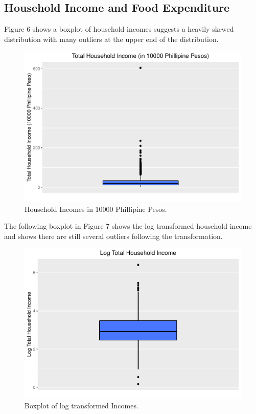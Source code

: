 \documentclass[
]{article}
\begin{document}
\hypertarget{household-income-and-food-expenditure}{%
\subsection{Household Income and Food
Expenditure}\label{household-income-and-food-expenditure}}

Figure 6 shows a boxplot of household incomes suggests a heavily skewed
distribution with many outliers at the upper end of the distribution.

\begin{figure}[H]

{\centering \includegraphics[width=0.8\linewidth]{Group_01_Project2_demo_files/figure-latex/balance boxplot-1} 

}

\caption{Household Incomes in 10000 Phillipine Pesos.}\label{fig:balance boxplot}
\end{figure}

The following boxplot in Figure 7 shows the log transformed household
income and shows there are still several outliers following the
transformation.

\begin{figure}[H]

{\centering \includegraphics[width=0.8\linewidth]{Group_01_Project2_demo_files/figure-latex/balance boxplot2-1} 

}

\caption{Boxplot of log transformed Incomes.}\label{fig:balance boxplot2}
\end{figure}
\end{document}
